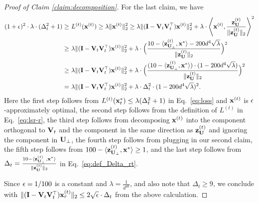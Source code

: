 \begin{proof}[Proof of Claim \ref{claim:decomposition}]
For the last claim, we have
\begin{align*}
(1+\epsilon)^2 \cdot \lambda \cdot (\Delta_{t}^2 + 1) \geq &~ L^{(t)}(\mathbf{x}^{(t)}) \geq \lambda \|\mathbf{x}^{(t)}\|_2^2 
\geq \lambda \|(\mathbf{I} - \mathbf{V}_{t}\mathbf{V}_{t}^\top)\mathbf{x}^{(t)}\|_2^2 + \lambda \cdot \left\langle \mathbf{x}^{(t)}, \frac{\mathbf{z}_{\mathbf{U}}^{(t)}}{\|\mathbf{z}_{\mathbf{U}}^{(t)}\|_2}\right\rangle^2 \\
\geq &~ \lambda \|(\mathbf{I} - \mathbf{V}_{t}\mathbf{V}_{t}^\top)\mathbf{x}^{(t)}\|_2^2 + \lambda \cdot \Big( \frac{10 - \langle \mathbf{z}_{\mathbf{U}_\perp}^{(t)},\mathbf{x}^{*}\rangle - 200d^4 \sqrt{\lambda}}{\|\mathbf{z}_{\mathbf{U}}^{(t)}\|_2} \Big)^2 \\
\geq &~ \lambda \|(\mathbf{I} - \mathbf{V}_{t}\mathbf{V}_{t}^\top)\mathbf{x}^{(t)}\|_2^2 + \lambda \cdot \Big( \frac{(10 - \langle \mathbf{z}_{\mathbf{U}_\perp}^{(t)},\mathbf{x}^{*}\rangle) \cdot( 1 - 200d^4 \sqrt{\lambda})}{\|\mathbf{z}_{\mathbf{U}}^{(t)}\|_2} \Big)^2 \\
= &~ \lambda \|(\mathbf{I} - \mathbf{V}_{t}\mathbf{V}_{t}^\top)\mathbf{x}^{(t)}\|_2^2 + \lambda \cdot \Delta_{t}^2 \cdot (1 - 200d^4\sqrt{\lambda})^2.
\end{align*}
Here the first step follows from $L^{(t)}(\mathbf{x}_{t}^{*}) \leq \lambda (\Delta_{t}^2 + 1)$ in Eq.~\eqref{eq:loss} and $\mathbf{x}^{(t)}$ is $\epsilon$-approximately optimal, the second step follows from the definition of $L^{(t)}$ in Eq.~\eqref{eq:lsr-r}, the third step follows from decomposing $\mathbf{x}^{(t)}$ into the component orthogonal to $\mathbf{V}_{t}$ and the component in the same direction as $\mathbf{z}_{\mathbf{U}}^{(t)}$ and ignoring the component in $\mathbf{U}_\perp$, the fourth step follows from plugging in our second claim, the fifth step follows from $100 - \langle \mathbf{z}_{\mathbf{U}_\perp}^{(t)}, \mathbf{x}^{*}\rangle \geq 1$, and the last step follows from $\Delta_{t} = \frac{10 - \langle \mathbf{z}_{\mathbf{U}_\perp}^{(t)}, \mathbf{x}^{*}\rangle}{\|\mathbf{z}_{\mathbf{U}}^{(t)}\|_2}$ in Eq.~\eqref{eq:def_Delta_rt}.

Since $\epsilon = 1/100$ is a constant and $\lambda = \frac{1}{d^{40}}$, and also note that $\Delta_t \geq 9$, we conclude with $\|(\mathbf{I} - \mathbf{V}_{t}\mathbf{V}_{t}^\top)\mathbf{x}_{r}^{(t)}\|_2 \leq 2 \sqrt{\epsilon} \cdot \Delta_{t}$ from the above calculation.
\end{proof}






